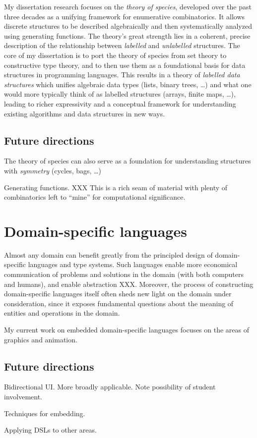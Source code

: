 \documentclass[12pt]{article}
\begin{document}
My dissertation research focuses on the \emph{theory of species},
developed over the past three decades as a unifying framework for
enumerative combinatorics. It allows discrete structures to be
described algebraically and then systematically analyzed using
generating functions.  The theory's great strength lies in a coherent,
precise description of the relationship between \emph{labelled} and
\emph{unlabelled} structures.  The core of my dissertation is to port
the theory of species from set theory to constructive type theory, and
to then use them as a foundational basis for data structures in
programming languages. This results in a theory of \emph{labelled data
  structures} which unifies algebraic data types (lists, binary trees,
\dots) and what one would more typically think of as labelled
structures (arrays, finite maps, \dots), leading to richer
expressivity and a conceptual framework for understanding existing
algorithms and data structures in new ways.

\subsection*{Future directions}

The theory of species can also serve as a foundation for understanding
structures with \emph{symmetry} (cycles, bags, \dots)

Generating functions. XXX This is a rich seam of material with plenty
of combinatorics left to ``mine'' for computational significance.

\section*{Domain-specific languages}
\label{sec:edsls}

Almost any domain can benefit greatly from the principled design of
domain-specific languages and type systems.  Such languages enable
more economical communication of problems and solutions in the domain
(with both computers and humans), and enable abstraction XXX.
Moreover, the process of constructing domain-specific languages itself
often sheds new light on the domain under consideration, since it
exposes fundamental questions about the meaning of entities and
operations in the domain.

My current work on embedded domain-specific languages focuses on the
areas of graphics and animation.

\subsection*{Future directions}

Bidirectional UI.  More broadly applicable.  Note possibility of
student involvement.

Techniques for embedding.

Applying DSLs to other areas.
\end{document}
